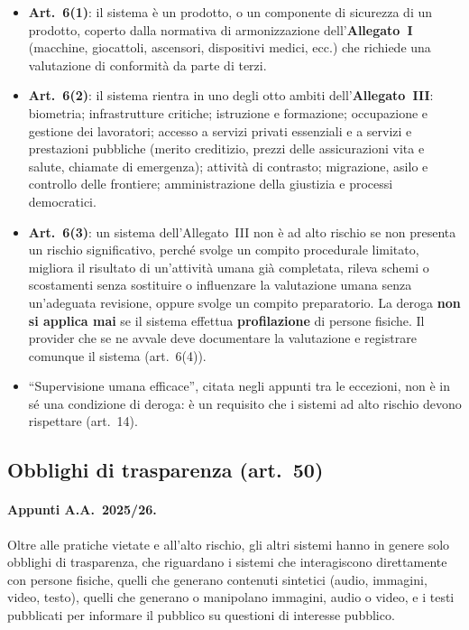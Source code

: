 \begin{integrazione}
\begin{itemize}
  \item \textbf{Art.~6(1)}: il sistema è un prodotto, o un componente di sicurezza di un prodotto,
    coperto dalla normativa di armonizzazione dell'\textbf{Allegato~I} (macchine, giocattoli,
    ascensori, dispositivi medici, ecc.) che richiede una valutazione di conformità da parte di terzi.
  \item \textbf{Art.~6(2)}: il sistema rientra in uno degli otto ambiti dell'\textbf{Allegato~III}:
    biometria; infrastrutture critiche; istruzione e formazione; occupazione e gestione dei
    lavoratori; accesso a servizi privati essenziali e a servizi e prestazioni pubbliche (merito
    creditizio, prezzi delle assicurazioni vita e salute, chiamate di emergenza); attività di
    contrasto; migrazione, asilo e controllo delle frontiere; amministrazione della giustizia e
    processi democratici.
  \item \textbf{Art.~6(3)}: un sistema dell'Allegato~III non è ad alto rischio se non presenta un
    rischio significativo, perché svolge un compito procedurale limitato, migliora il risultato di
    un'attività umana già completata, rileva schemi o scostamenti senza sostituire o influenzare la
    valutazione umana senza un'adeguata revisione, oppure svolge un compito preparatorio. La deroga
    \textbf{non si applica mai} se il sistema effettua \textbf{profilazione} di persone fisiche. Il
    provider che se ne avvale deve documentare la valutazione e registrare comunque il sistema
    (art.~6(4)).
  \item ``Supervisione umana efficace'', citata negli appunti tra le eccezioni, non è in sé una
    condizione di deroga: è un requisito che i sistemi ad alto rischio devono rispettare (art.~14).
\end{itemize}
\end{integrazione}

\subsection{Obblighi di trasparenza (art.~50)}
\label{sec:aiact-trasparenza}
\paragraph{Appunti A.A.~2025/26.} Oltre alle pratiche vietate e all'alto rischio, gli altri sistemi
hanno in genere solo obblighi di trasparenza, che riguardano i sistemi che interagiscono direttamente con
persone fisiche, quelli che generano contenuti sintetici (audio, immagini, video, testo), quelli che
generano o manipolano immagini, audio o video, e i testi pubblicati per informare il pubblico su
questioni di interesse pubblico.

